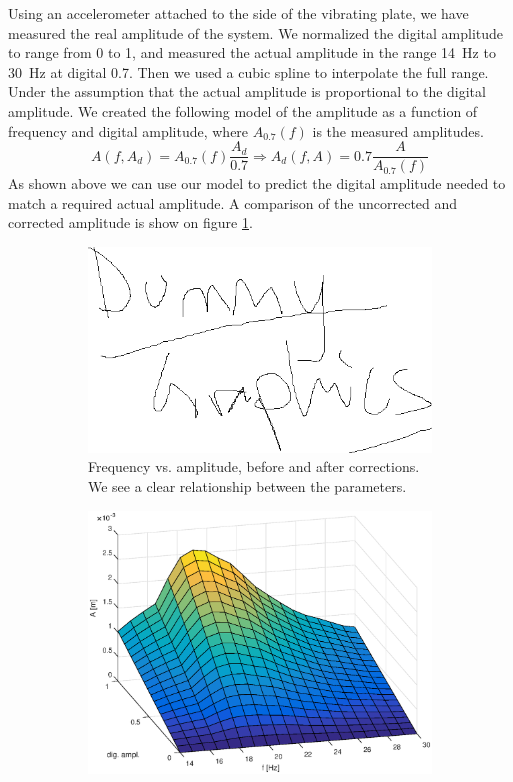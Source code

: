 \documentclass[12pt,oneside,a4paper]{article}
\numberwithin{equation}{section}
\begin{document}
{{{{Using an accelerometer attached to the side of the vibrating plate, we have measured the real amplitude of the system. We normalized the digital amplitude to range from 0 to 1, and measured the actual amplitude in the range \SI{14}{Hz} to \SI{30}{Hz} at digital 0.7. Then we used a cubic spline to interpolate the full range. Under the assumption that the actual amplitude is proportional to the digital amplitude. We created the following model of the amplitude as a function of frequency and digital amplitude, where $A_{0.7}(f)$ is the measured amplitudes.
\begin{equation}
	A(f,A_{d}) = A_{0.7}(f)\frac{A_{d}}{0.7} \Rightarrow A_d(f,A) = 0.7\frac{A}{A_{0.7}(f)}
	\label{ampl_model}
\end{equation}
As shown above we can use our model to predict the digital amplitude needed to match a required actual amplitude. A comparison of the uncorrected and corrected amplitude is show on figure \ref{frq_vs_ampl_plot}.
\begin{figure}[h]
	\centering
	\begin{subfigure}[t]{0.49\textwidth}
		\centering
		\includegraphics[width=\textwidth]{dummy.png} 
		\caption{Frequency vs. amplitude, before and after corrections. We see a clear relationship between the parameters.}
		\label{frq_vs_ampl_plot}
	\end{subfigure}\hfill
	\begin{subfigure}[t]{0.49\textwidth}
		\centering
		\includegraphics[width=\textwidth]{surfplot}

\end{subfigure}
\end{figure}}}}}
\end{document}
